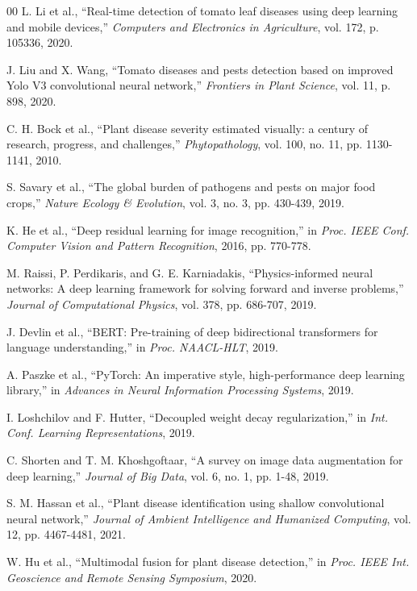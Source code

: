 \documentclass[conference]{IEEEtran}
\begin{document}
\begin{thebibliography}{00}
L. Li et al., ``Real-time detection of tomato leaf diseases using deep learning and mobile devices,'' \textit{Computers and Electronics in Agriculture}, vol. 172, p. 105336, 2020.

J. Liu and X. Wang, ``Tomato diseases and pests detection based on improved Yolo V3 convolutional neural network,'' \textit{Frontiers in Plant Science}, vol. 11, p. 898, 2020.

C. H. Bock et al., ``Plant disease severity estimated visually: a century of research, progress, and challenges,'' \textit{Phytopathology}, vol. 100, no. 11, pp. 1130-1141, 2010.

S. Savary et al., ``The global burden of pathogens and pests on major food crops,'' \textit{Nature Ecology \& Evolution}, vol. 3, no. 3, pp. 430-439, 2019.

K. He et al., ``Deep residual learning for image recognition,'' in \textit{Proc. IEEE Conf. Computer Vision and Pattern Recognition}, 2016, pp. 770-778.

M. Raissi, P. Perdikaris, and G. E. Karniadakis, ``Physics-informed neural networks: A deep learning framework for solving forward and inverse problems,'' \textit{Journal of Computational Physics}, vol. 378, pp. 686-707, 2019.

J. Devlin et al., ``BERT: Pre-training of deep bidirectional transformers for language understanding,'' in \textit{Proc. NAACL-HLT}, 2019.

A. Paszke et al., ``PyTorch: An imperative style, high-performance deep learning library,'' in \textit{Advances in Neural Information Processing Systems}, 2019.

I. Loshchilov and F. Hutter, ``Decoupled weight decay regularization,'' in \textit{Int. Conf. Learning Representations}, 2019.

C. Shorten and T. M. Khoshgoftaar, ``A survey on image data augmentation for deep learning,'' \textit{Journal of Big Data}, vol. 6, no. 1, pp. 1-48, 2019.

S. M. Hassan et al., ``Plant disease identification using shallow convolutional neural network,'' \textit{Journal of Ambient Intelligence and Humanized Computing}, vol. 12, pp. 4467-4481, 2021.

W. Hu et al., ``Multimodal fusion for plant disease detection,'' in \textit{Proc. IEEE Int. Geoscience and Remote Sensing Symposium}, 2020.


\end{thebibliography}
\end{document}
